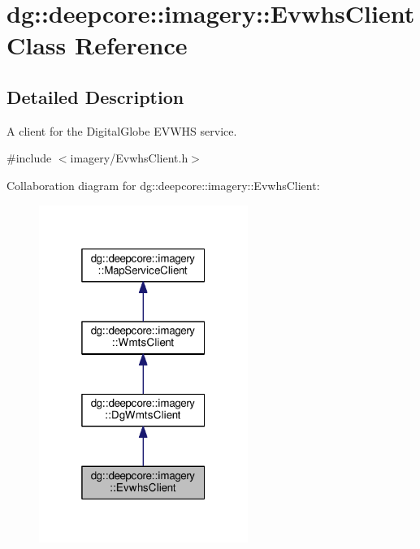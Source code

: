 \hypertarget{structdg_1_1deepcore_1_1imagery_1_1_evwhs_client}{}\section{dg\+:\+:deepcore\+:\+:imagery\+:\+:Evwhs\+Client Class Reference}
\label{structdg_1_1deepcore_1_1imagery_1_1_evwhs_client}


\subsection{Detailed Description}
A client for the Digital\+Globe E\+V\+W\+HS service. 

{\ttfamily \#include $<$imagery/\+Evwhs\+Client.\+h$>$}



Collaboration diagram for dg\+:\+:deepcore\+:\+:imagery\+:\+:Evwhs\+Client\+:
\nopagebreak
\begin{figure}[H]
\begin{center}
\leavevmode
\includegraphics[width=193pt]{structdg_1_1deepcore_1_1imagery_1_1_evwhs_client__coll__graph}
\end{center}
\end{figure}
